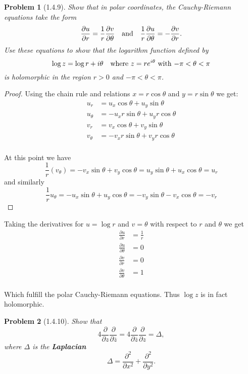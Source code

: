 \documentclass[10pt]{article}
\newcommand{\sk}{\vskip 10mm}
\newcommand{\conj}[1]{\overline{#1}}
\theoremstyle{plain}
\newtheorem{problem}{Problem}
\theoremstyle{remark}
\begin{document}
\sk

\begin{problem}[1.4.9]
  Show that in polar coordinates, the Cauchy-Riemann equations take the form
  \[
    \frac{\partial u}{\partial r}=\frac{1}{r}\frac{\partial v}{\partial\theta} \text{\quad and\quad} \frac{1}{r}\frac{\partial u}{\partial\theta}=-\frac{\partial v}{\partial r}.
  \]
  Use these equations to show that the logarithm function defined by
  \[
    \log z = \log r + i\theta \text{\quad  where $z=re^{i\theta}$ with $-\pi<\theta<\pi$}
  \]
  is holomorphic in the region $r>0$ and $-\pi<\theta<\pi$.
\end{problem}

\begin{proof}
  Using the chain rule and relations $x=r\cos\theta$ and $y=r\sin\theta$ we get:
  \begin{align*}
    u_r &= u_x\cos\theta+u_y\sin\theta\\
    u_\theta &= -u_xr\sin\theta+u_yr\cos\theta\\
    v_r &= v_x\cos\theta+v_y\sin\theta\\
    v_\theta &= -v_xr\sin\theta+v_yr\cos\theta\\
  \end{align*}

  At this point we have
  \[
    \frac{1}{r}(v_\theta)=-v_x\sin\theta+v_y\cos\theta=u_y\sin\theta+u_x\cos\theta=u_r
  \]
  and similarly
  \[
    \frac{1}{r}u_\theta = -u_x\sin\theta+u_y\cos\theta = -v_y\sin\theta-v_x\cos\theta=-v_r
  \]
\end{proof}

Taking the derivatives for $u=\log r$ and $v=\theta$ with respect to $r$ and $\theta$ we get
\begin{align*}
  \frac{\partial u}{\partial r} &= \frac{1}{r}\\
  \frac{\partial u}{\partial\theta} &= 0\\
  \frac{\partial v}{\partial r} &= 0\\
  \frac{\partial v}{\partial\theta} &= 1\\
\end{align*}

Which fulfill the polar Cauchy-Riemann equations. Thus $\log z$ is in fact
holomorphic.

\sk

\begin{problem}[1.4.10]
  Show that
  \[
    4\frac{\partial}{\partial z}\frac{\partial}{\partial \conj{z}}=4\frac{\partial}{\partial\conj{z}}\frac{\partial}{\partial z}=\Delta,
  \]
  where $\Delta$ is the \textbf{Laplacian}
  \[
    \Delta = \frac{\partial^2}{\partial x^2}+\frac{\partial^2}{\partial y^2}.
  \]
\end{problem}
\end{document}
